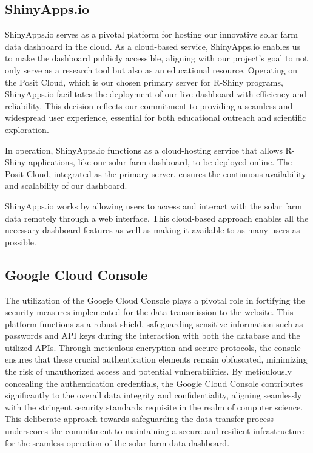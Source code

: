 \documentclass{sigchi}
\begin{document}
\subsection{ShinyApps.io} 
ShinyApps.io serves as a pivotal platform for hosting our innovative solar farm data dashboard in the cloud. As a cloud-based service, ShinyApps.io enables us to make the dashboard publicly accessible, aligning with our project's goal to not only serve as a research tool but also as an educational resource. Operating on the Posit Cloud, which is our chosen primary server for R-Shiny programs, ShinyApps.io facilitates the deployment of our live dashboard with efficiency and reliability. This decision reflects our commitment to providing a seamless and widespread user experience, essential for both educational outreach and scientific exploration.

In operation, ShinyApps.io functions as a cloud-hosting service that allows R-Shiny applications, like our solar farm dashboard, to be deployed online. The Posit Cloud, integrated as the primary server, ensures the continuous availability and scalability of our dashboard. 

ShinyApps.io works by allowing users to access and interact with the solar farm data remotely through a web interface. This cloud-based approach enables all the necessary dashboard features as well as making it available to as many users as possible.

\subsection{Google Cloud Console}
The utilization of the Google Cloud Console plays a pivotal role in fortifying the security measures implemented for the data transmission to the website. This platform functions as a robust shield, safeguarding sensitive information such as passwords and API keys during the interaction with both the database and the utilized APIs. Through meticulous encryption and secure protocols, the console ensures that these crucial authentication elements remain obfuscated, minimizing the risk of unauthorized access and potential vulnerabilities. By meticulously concealing the authentication credentials, the Google Cloud Console contributes significantly to the overall data integrity and confidentiality, aligning seamlessly with the stringent security standards requisite in the realm of computer science. This deliberate approach towards safeguarding the data transfer process underscores the commitment to maintaining a secure and resilient infrastructure for the seamless operation of the solar farm data dashboard.
\end{document}
